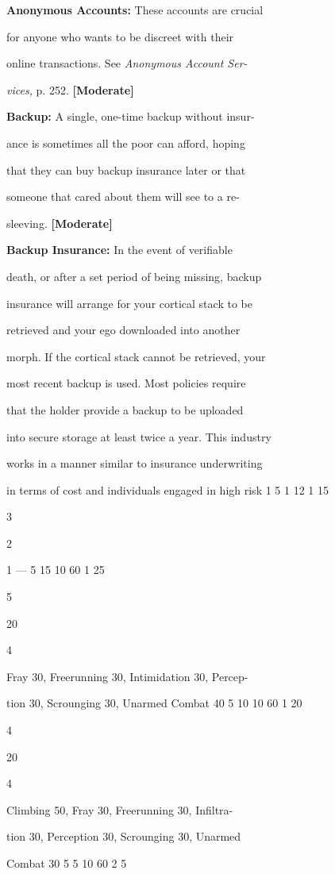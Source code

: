\textbf{Anonymous Accounts:} These accounts are crucial 

for anyone who wants to be discreet with their 

online transactions. See \textit{Anonymous Account Ser-}

\textit{vices,} p. 252. \textbf{[Moderate]}

\textbf{Backup:} A single, one-time backup without insur-

ance is sometimes all the poor can afford, hoping 

that they can buy backup insurance later or that 

someone that cared about them will see to a re-

sleeving. \textbf{[Moderate]}

\textbf{Backup Insurance:} In the event of verifiable 

death, or after a set period of being missing, backup 

insurance will arrange for your cortical stack to be 

retrieved and your ego downloaded into another 

morph. If the cortical stack cannot be retrieved, your 

most recent backup is used. Most policies require 

that the holder provide a backup to be uploaded 

into secure storage at least twice a year. This industry 

works in a manner similar to insurance underwriting 

in terms of cost and individuals engaged in high risk 
1
5
1
12
1
15

3

2

1 —
5
15 10 60
1
25

5

20

4

Fray 30, Freerunning 30, Intimidation 30, Percep-

tion 30, Scrounging 30, Unarmed Combat 40
5
10 10 60
1
20

4

20

4

Climbing 50, Fray 30, Freerunning 30, Infiltra-

tion 30, Perception 30, Scrounging 30, Unarmed 

Combat 30
5
5
10 60
2
5

